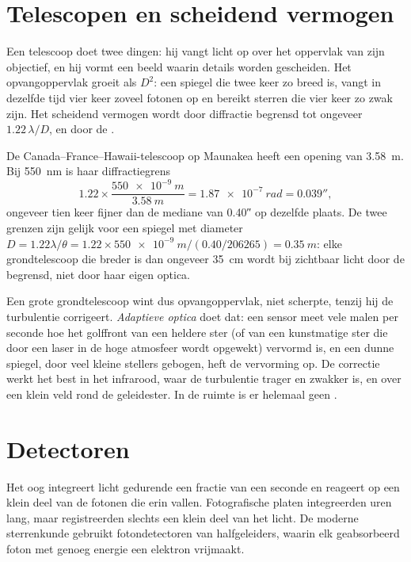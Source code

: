 \section{Telescopen en scheidend vermogen}

Een telescoop doet twee dingen: hij vangt licht op over het oppervlak van zijn
objectief, en hij vormt een beeld waarin details worden gescheiden. Het
opvangoppervlak groeit als $D^2$: een spiegel die twee keer zo breed is, vangt
in dezelfde tijd vier keer zoveel fotonen op en bereikt sterren die vier keer zo
zwak zijn. Het scheidend vermogen wordt door diffractie begrensd tot ongeveer
$1.22\,\lambda/D$, en door de .

\begin{example}
De Canada--France--Hawaii-telescoop op Maunakea heeft een opening van
\qty{3.58}{m}. Bij \qty{550}{nm} is haar diffractiegrens
\[
  1.22\times\frac{\qty{550e-9}{m}}{\qty{3.58}{m}} = \qty{1.87e-7}{rad}
  = \ang{;;0.039},
\]
ongeveer tien keer fijner dan de mediane  van \ang{;;0.40} op dezelfde
plaats. De twee grenzen zijn gelijk voor een spiegel met diameter $D = 1.22\lambda/\theta =
1.22\times\qty{550e-9}{m}/(\num{0.40}/\num{206265}) = \qty{0.35}{m}$: elke
grondtelescoop die breder is dan ongeveer \qty{35}{cm} wordt bij zichtbaar licht
door de  begrensd, niet door haar eigen optica.
\end{example}

Een grote grondtelescoop wint dus opvangoppervlak, niet scherpte, tenzij hij de
turbulentie corrigeert. \emph{Adaptieve optica} doet dat: een sensor meet vele malen
per seconde hoe het golffront van een heldere ster (of van een kunstmatige ster die
door een laser in de hoge atmosfeer wordt opgewekt) vervormd is, en een dunne
spiegel, door veel kleine stellers gebogen, heft de vervorming op. De correctie werkt
het best in het infrarood, waar de turbulentie trager en zwakker is, en over een klein
veld rond de geleidester. In de ruimte is er helemaal geen .

\section{Detectoren}

Het oog integreert licht gedurende een fractie van een seconde en reageert op een
klein deel van de fotonen die erin vallen. Fotografische platen integreerden uren lang,
maar registreerden slechts een klein deel van het licht. De moderne sterrenkunde
gebruikt fotondetectoren van halfgeleiders, waarin elk geabsorbeerd foton met genoeg
energie een elektron vrijmaakt.

